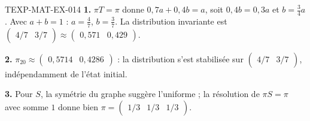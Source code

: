 \begin{corrige}{TEXP-MAT-EX-014}
\textbf{1.} $\pi T=\pi$ donne $0{,}7a+0{,}4b=a$, soit $0{,}4b=0{,}3a$ et
$b=\tfrac34a$. Avec $a+b=1$ : $a=\tfrac47$, $b=\tfrac37$. La distribution
invariante est $\begin{pmatrix}4/7&3/7\end{pmatrix}\approx
\begin{pmatrix}0{,}571&0{,}429\end{pmatrix}$.

\textbf{2.} $\pi_{20}\approx\begin{pmatrix}0{,}5714&0{,}4286\end{pmatrix}$ :
la distribution s'est stabilisée sur $\begin{pmatrix}4/7&3/7\end{pmatrix}$,
indépendamment de l'état initial.

\textbf{3.} Pour $S$, la symétrie du graphe suggère l'uniforme ; la résolution
de $\pi S=\pi$ avec somme $1$ donne bien
$\pi=\begin{pmatrix}1/3&1/3&1/3\end{pmatrix}$.
\end{corrige}

